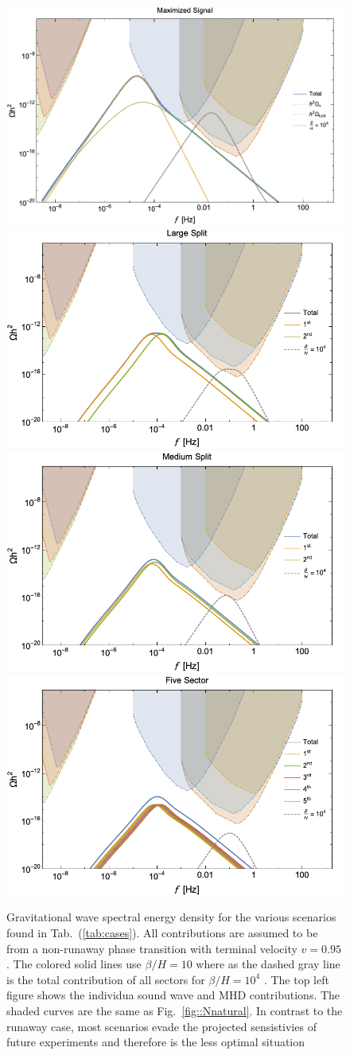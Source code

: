 \documentclass[nofootinbib,twocolumn,preprintnumbers]{revtex4-1}
\begin{document}
\begin{figure}[tb]
\centering
\begin{minipage}[c]{\textwidth}
\includegraphics[width=.45\textwidth ]{MaxSW.png}
\hfill
\includegraphics[width=.45\textwidth]{largeSW.png} 
\hfill
\includegraphics[width=.45\textwidth]{MedSW.png} 
\hfill
\includegraphics[width=.45\textwidth]{fiveSW.png} 
\end{minipage}
\hfill
\caption{ Gravitational wave spectral energy density for the various scenarios found in Tab.~(\ref{tab:cases}).  All contributions are assumed to be from a non-runaway phase transition with terminal velocity $v = 0.95$. The colored solid lines use $\beta/H  = 10$ where as the dashed gray line is the total contribution of all sectors for $\beta/H  = 10^4$ . The top left figure shows the individua sound wave and MHD contributions.  The shaded curves are the same as Fig.~\ref{fig::Nnatural}. In contrast to the runaway case, most scenarios evade the projected sensistivies of future experiments and therefore is the less optimal situation }
\label{fig:Haasw}
\end{figure}
\end{document}
